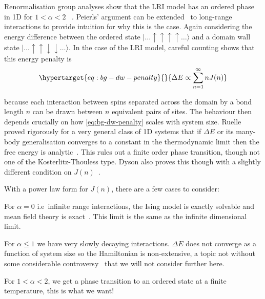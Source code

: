Renormalisation group analyses show that the LRI model has an ordered phase in 1D for \(1 < \alpha < 2\) ~\autocite{dysonExistencePhasetransitionOnedimensional1969}. Peierls' argument can be extended~\autocite{thoulessLongRangeOrderOneDimensional1969} to long-range interactions to provide intuition for why this is the case. Again considering the energy difference between the ordered state \(|\ldots\uparrow\uparrow\uparrow\uparrow\ldots\rangle\) and a domain wall state \(|\ldots\uparrow\uparrow\downarrow\downarrow\ldots\rangle\). In the case of the LRI model, careful counting shows that this energy penalty is \begin{equation}\protect\hypertarget{eq:bg-dw-penalty}{}{\Delta E \propto \sum_{n=1}^{\infty} n J(n)}\label{eq:bg-dw-penalty}\end{equation}

because each interaction between spins separated across the domain by a bond length \(n\) can be drawn between \(n\) equivalent pairs of sites. The behaviour then depends crucially on how \cref{eq:bg-dw-penalty} scales with system size. Ruelle proved rigorously for a very general class of 1D systems that if \(\Delta E\) or its many-body generalisation converges to a constant in the thermodynamic limit then the free energy is analytic~\autocite{ruelleStatisticalMechanicsOnedimensional1968}. This rules out a finite order phase transition, though not one of the Kosterlitz-Thouless type. Dyson also proves this though with a slightly different condition on \(J(n)\)~\autocite{dysonExistencePhasetransitionOnedimensional1969}.

With a power law form for \(J(n)\), there are a few cases to consider:

For \(\alpha = 0\) i.e~infinite range interactions, the Ising model is exactly solvable and mean field theory is exact~\autocite{lipkinValidityManybodyApproximation1965}. This limit is the same as the infinite dimensional limit.

For \(\alpha \leq 1\) we have very slowly decaying interactions. \(\Delta E\) does not converge as a function of system size so the Hamiltonian is non-extensive, a topic not without some considerable controversy~\autocite{grossNonextensiveHamiltonianSystems2002,lutskoQuestioningValidityNonextensive2011,wangCommentNonextensiveHamiltonian2003} that we will not consider further here.

For \(1 < \alpha < 2\), we get a phase transition to an ordered state at a finite temperature, this is what we want!

